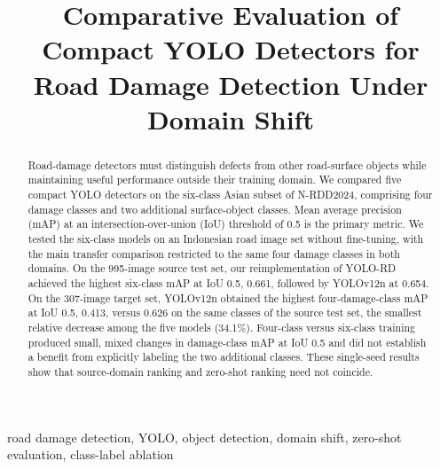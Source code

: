 \documentclass[conference]{IEEEtran}
\newif\ifdistractoranalysis \distractoranalysistrue %
\begin{document}
\title{Comparative Evaluation of Compact YOLO Detectors for Road Damage Detection Under Domain Shift}

\author{
\and
{}
}

\maketitle

\begin{abstract}
Road-damage detectors must distinguish defects from other road-surface objects while maintaining useful performance outside their training domain. We compared five compact YOLO detectors on the six-class Asian subset of N-RDD2024, comprising four damage classes and two additional surface-object classes. Mean average precision (mAP) at an intersection-over-union (IoU) threshold of 0.5 is the primary metric. We tested the six-class models on an Indonesian road image set without fine-tuning, with the main transfer comparison restricted to the same four damage classes in both domains. On the 995-image source test set, our reimplementation of YOLO-RD achieved the highest six-class mAP at IoU 0.5, 0.661, followed by YOLOv12n at 0.654. On the 307-image target set, YOLOv12n obtained the highest four-damage-class mAP at IoU 0.5, 0.413, versus 0.626 on the same classes of the source test set, the smallest relative decrease among the five models (34.1\%). \ifdistractoranalysis Four-class versus six-class training produced small, mixed changes in damage-class mAP at IoU 0.5 and did not establish a benefit from explicitly labeling the two additional classes.\fi{} These single-seed results show that source-domain ranking and zero-shot ranking need not coincide.
\end{abstract}

\begin{IEEEkeywords}
road damage detection, YOLO, object detection, domain shift, zero-shot evaluation, class-label ablation
\end{IEEEkeywords}
\end{document}

